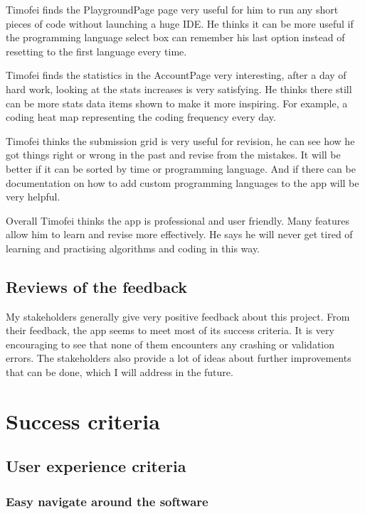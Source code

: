 \documentclass[report.tex]{subfiles}
\begin{document}
Timofei finds the PlaygroundPage page very useful for him to run any short pieces of code without launching a huge IDE. He thinks it can be more useful if the programming language select box can remember his last option instead of resetting to the first language every time.

Timofei finds the statistics in the AccountPage very interesting, after a day of hard work, looking at the stats increases is very satisfying. He thinks there still can be more stats data items shown to make it more inspiring. For example, a coding heat map representing the coding frequency every day.

Timofei thinks the submission grid is very useful for revision, he can see how he got things right or wrong in the past and revise from the mistakes. It will be better if it can be sorted by time or programming language. And if there can be documentation on how to add custom programming languages to the app will be very helpful.

Overall Timofei thinks the app is professional and user friendly. Many features allow him to learn and revise more effectively. He says he will never get tired of learning and practising algorithms and coding in this way.

\subsection{Reviews of the feedback}

My stakeholders generally give very positive feedback about this project. From their feedback, the app seems to meet most of its success criteria. It is very encouraging to see that none of them encounters any crashing or validation errors. The stakeholders also provide a lot of ideas about further improvements that can be done, which I will address in the future.

\section{Success criteria}

\subsection{User experience criteria}

\subsubsection{Easy navigate around the software}
\end{document}
